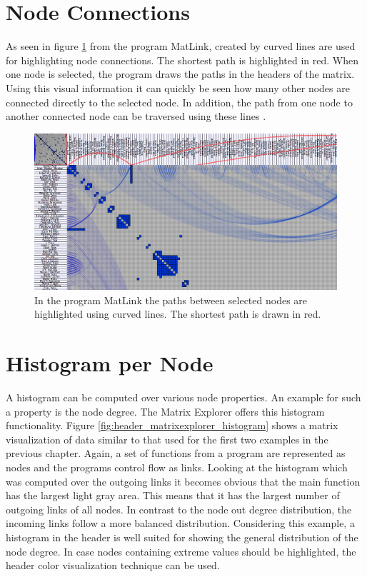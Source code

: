 \section{Node Connections}
As seen in figure \ref{fig:header_matlink} from the program MatLink, created by \citep[105-118]{henry-phd-2008} curved lines are used for highlighting node connections. The shortest path is highlighted in red. When one node is selected, the program draws the paths in the headers of the matrix. Using this visual information it can quickly be seen how many other nodes are connected directly to the selected node. In addition, the path from one node to another connected node can be traversed using these lines \citep[105-118]{henry-phd-2008}.

\begin{figure}[tp]
  \centering
  \includegraphics[keepaspectratio,width=\hsize,height=\halfh]
  {images/Header_MatLink_path.png}
  
  \caption[Highlighting Matrix Paths]{
  In the program MatLink \citep[105-118]{henry-phd-2008} the paths between selected nodes are highlighted using curved lines. The shortest path is drawn in red.
  }
  \label{fig:header_matlink}
\end{figure}

\section{Histogram per Node}
\label{sec:histogram-per-node}
A histogram can be computed over various node properties. An example for such a property is the node degree. The Matrix Explorer offers this histogram functionality. Figure \ref{fig:header_matrixexplorer_histogram} shows a matrix visualization of data similar to that used for the first two examples in the previous chapter. Again, a set of functions from a program are represented as nodes and the programs control flow as links. Looking at the histogram which was computed over the outgoing links it becomes obvious that the main function has the largest light gray area. This means that it has the largest number of outgoing links of all nodes. In contrast to the node out degree distribution, the incoming links follow a more balanced distribution. Considering this example, a histogram in the header is well suited for showing the general distribution of the node degree. In case nodes containing extreme values should be highlighted, the header color visualization technique can be used.


